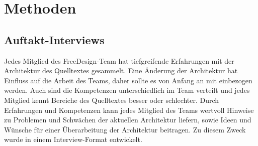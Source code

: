 \chapter{Methoden}

\section{Auftakt-Interviews}
Jedes Mitglied des FreeDesign-Team hat tiefgreifende Erfahrungen mit der Architektur des Quelltextes gesammelt. Eine Änderung der Architektur hat Einfluss auf die Arbeit des Teams, daher sollte es von Anfang an mit einbezogen werden. Auch sind die Kompetenzen unterschiedlich im Team verteilt und jedes Mitglied kennt Bereiche des Quelltextes besser oder schlechter. Durch Erfahrungen und Kompetenzen kann jedes Mitglied des Teams wertvoll Hinweise zu Problemen und Schwächen der aktuellen Architektur liefern, sowie Ideen und Wünsche für einer Überarbeitung der Architektur beitragen. 
Zu diesem Zweck wurde in einem Interview-Format entwickelt.

